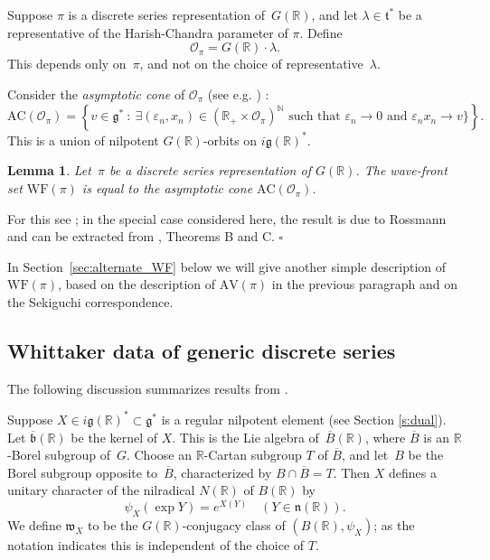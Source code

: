 \documentclass[10pt,leqno]{article}
\newtheorem{lemma}[equation]{Lemma}
\numberwithin{equation}{section}
\newcommand{\qed}{\hfill $\square$ \medskip}
\newcommand{\R}{\mathbb R}
\newcommand{\n}{\mathfrak n}
\renewcommand{\t}{\mathfrak t}
\newcommand{\g}{\mathfrak g}
\newcommand{\w}{\mathfrak w}
\newcommand{\AV}{\mathrm{AV}}
\newcommand{\WF}{\mathrm{WF}}
\newcommand{\AC}{\mathrm{AC}}
\begin{document}
Suppose $\pi$ is a discrete series representation of~$G(\R)$, and let $\lambda\in\t^*$ be a representative of the Harish-Chandra parameter of $\pi$.
Define
\begin{equation} \label{semisimple_orbit_HC} \mathcal{O}_{\pi}=G(\R)\cdot\lambda.\end{equation}
This depends only on~$\pi$, and not on the choice of representative~$\lambda$. 

Consider the \emph{asymptotic cone} of $\mathcal{O}_\pi$ (see e.g. \cite[Section 3]{AVAV}) :
\[ \AC(\mathcal{O}_\pi) = \left\{ v \in \g^* \ : \ \text{$\exists (\varepsilon_n, x_n)\in (\R_+ \times \mathcal{O}_\pi)^\mathbb{N}$ such that $\varepsilon_n \to 0$ and $\varepsilon_n x_n \to v$}\}  \right\}. \]
This is a union of nilpotent $G(\R)$-orbits on $i\g(\R)^*$.

\begin{lemma} \label{lem:WF_and_AC}
Let~$\pi$ be a discrete series representation of $G(\R)$. The wave-front set $\WF(\pi)$ is equal to the asymptotic cone $\AC(\mathcal{O}_\pi)$.
\end{lemma}

For this see \cite{HarrisHeOlafsson}; in the special case considered here, the result is due to Rossmann and can be extracted from \cite{RossmannPicard}, Theorems B and C. \qed

In Section~\ref{sec:alternate_WF} below we will give another simple
description of~$\WF(\pi)$, based on the description of $\AV(\pi)$ in
the previous paragraph and on the Sekiguchi correspondence.

\subsection{Whittaker data of generic discrete series}
\label{s:gds}

The following discussion summarizes results from \cite[Section~3]{adams_kaletha}.


Suppose $X\in i\g(\R)^*\subset \g^*$ is a regular nilpotent element (see Section \ref{s:dual}).
Let $\overline{\mathfrak b}(\R)$ be the kernel of $X$. This is the Lie algebra of~$\overline{B}(\R)$, where
$\overline{B}$ is an $\R$-Borel subgroup of~$G$.
Choose an $\R$-Cartan subgroup $T$ of
$\overline B$, and let~$B$ be the  Borel
subgroup opposite to~$\overline{B}$, characterized by $B\cap \overline B=T$.
Then $X$ defines a unitary
character of the nilradical  $N(\R)$  of $B(\R)$ by
\[ 
\psi_X(\exp Y)=e^{X(Y)}\quad (Y\in\n(\R)).
\] 
We define $\w_X$ to be the $G(\R)$-conjugacy class of $(B(\R),\psi_X)$; as the notation indicates this is independent 
of the choice of $T$.
\end{document}

